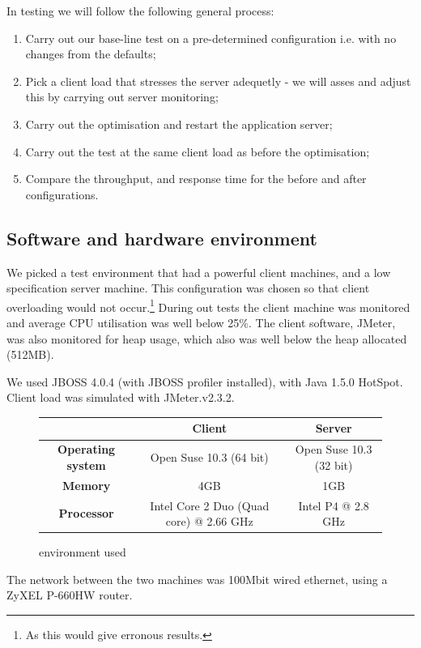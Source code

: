 In testing we will follow the following general process:
\begin{enumerate}
 \item Carry out our base-line test on a pre-determined configuration i.e. with no changes from the defaults;
 \item Pick a client load that stresses the server adequetly - we will asses and adjust this by carrying out server monitoring;
 \item Carry out the optimisation and restart the application server;
 \item Carry out the test at the same client load as before the optimisation;
 \item Compare the throughput, and response time for the before and after configurations.
\end{enumerate}

\subsection*{Software and hardware environment}

We picked a test environment that had a powerful client machines, and a low specification server machine. This configuration was chosen so that client overloading would not occur.\footnote{As this would give erronous results.} During out tests the client machine was monitored and average CPU utilisation was well below 25\%. The client software, JMeter, was also monitored for heap usage, which also was well below the heap allocated (512MB).

We used JBOSS 4.0.4 (with JBOSS profiler installed), with Java 1.5.0 HotSpot. Client load was simulated with JMeter.v2.3.2.

\begin{figure}[ht]
 \centering
\begin{tabular}{| c | c | c |}
 \hline
  & \textbf{Client} & \textbf{Server} \\
 \hline
 \textbf{Operating system} & Open Suse 10.3 (64 bit) & Open Suse 10.3 (32 bit) \\
 \textbf{Memory} & 4GB & 1GB \\
 \textbf{Processor} & Intel Core 2 Duo (Quad core) @ 2.66 GHz & Intel P4 @ 2.8 GHz \\
 \hline
\end{tabular}
\caption{environment used}
\end{figure}

The network between the two machines was 100Mbit wired ethernet, using a ZyXEL P-660HW router.

